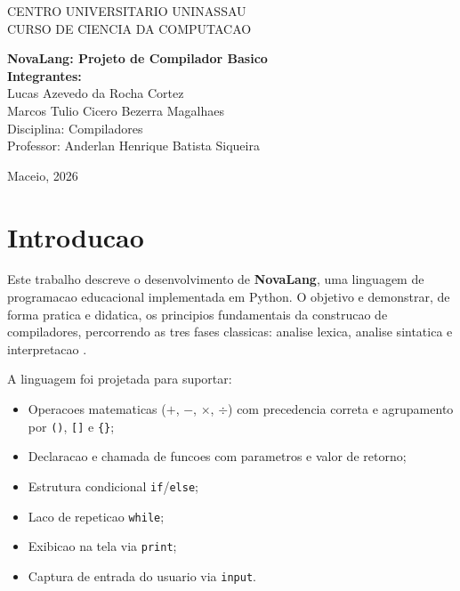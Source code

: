 \documentclass[12pt, a4paper]{article}
\begin{document}
\begin{titlepage}
  \centering

  {\large CENTRO UNIVERSITARIO UNINASSAU}\\[0.4cm]
  {\large CURSO DE CIENCIA DA COMPUTACAO}\\

  \vfill

  {\LARGE \textbf{NovaLang: Projeto de Compilador Basico}}\\[2.5cm]

  {\large \textbf{Integrantes:}}\\[0.4cm]
  {\large Lucas Azevedo da Rocha Cortez}\\[0.2cm]
  {\large Marcos Tulio Cicero Bezerra Magalhaes}\\[1.2cm]

  {\large Disciplina: Compiladores}\\[0.5cm]
  {\large Professor: Anderlan Henrique Batista Siqueira}\\

  \vfill

  {\large Maceio, 2026}
\end{titlepage}

\tableofcontents
\newpage

\section{Introducao}

Este trabalho descreve o desenvolvimento de \textbf{NovaLang}, uma linguagem
de programacao educacional implementada em Python. O objetivo e demonstrar,
de forma pratica e didatica, os principios fundamentais da construcao de
compiladores, percorrendo as tres fases classicas: analise lexica, analise
sintatica e interpretacao \cite{aho2007}.

A linguagem foi projetada para suportar:
\begin{itemize}
  \item Operacoes matematicas ($+$, $-$, $\times$, $\div$) com precedencia
        correta e agrupamento por \texttt{()}, \texttt{[]} e \texttt{\{\}};
  \item Declaracao e chamada de funcoes com parametros e valor de retorno;
  \item Estrutura condicional \texttt{if}/\texttt{else};
  \item Laco de repeticao \texttt{while};
  \item Exibicao na tela via \texttt{print};
  \item Captura de entrada do usuario via \texttt{input}.
\end{itemize}
\end{document}
